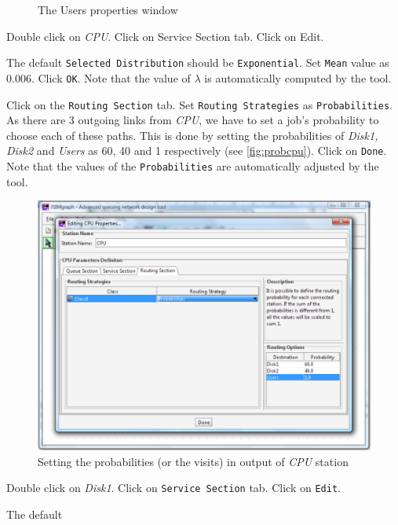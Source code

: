 \begin{itemize*}
\begin{figure}[htb]
\begin{center}
    \end{center}
    \caption{The Users properties window}
    \label{fig:uspropwin}
\end{figure}
\item Double click on \emph{CPU}. Click on Service Section tab.
Click on Edit. \item The default \texttt{Selected Distribution}
should be \texttt{Exponential}. Set \texttt{Mean} value as 0.006.
Click \texttt{OK}. Note that the value of $\lambda$ is
automatically computed by the tool.

\item Click on the \texttt{Routing Section} tab. Set
\texttt{Routing Strategies} as \texttt{Probabilities}. As there
are 3 outgoing links from \emph{CPU}, we have to set a job's
probability to choose each of these paths. This is done by setting
the probabilities of \emph{Disk1, Disk2} and \emph{Users} as 60,
40 and 1 respectively (see \autoref{fig:probcpu}). Click on
\texttt{Done}. Note that the values of the \texttt{Probabilities}
are automatically adjusted by the tool.
\begin{figure}[htb]
    \begin{center}
        \includegraphics[scale=.5]{img/jsimg/12.6.eps}
    \end{center}
    \caption{Setting the probabilities (or the visits) in output
    of  \emph{CPU} station}
    \label{fig:probcpu}
\end{figure}
\item Double click on \emph{Disk1}. Click on \texttt{Service
Section} tab. Click on \texttt{Edit}. \item The default

\end{itemize*}
